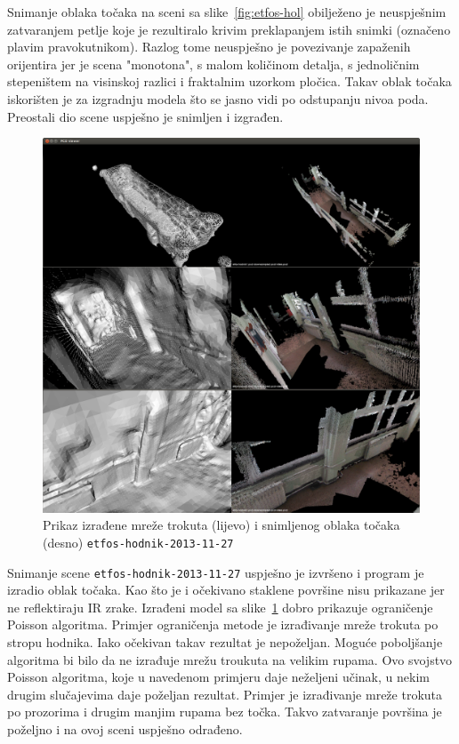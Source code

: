Snimanje oblaka točaka na sceni sa slike~\ref{fig:etfos-hol} obilježeno
je neuspješnim zatvaranjem petlje koje je rezultiralo krivim
preklapanjem istih snimki (označeno plavim pravokutnikom). Razlog tome
neuspješno je povezivanje zapaženih orijentira jer je scena "monotona",
s malom količinom detalja, s jednoličnim stepeništem na visinskoj
razlici i fraktalnim uzorkom pločica. Takav oblak točaka iskorišten je
za izgradnju modela što se jasno vidi po odstupanju nivoa poda.
Preostali dio scene uspješno je snimljen i izgrađen.

\newpage
\begin{figure}[h]
\centering
\includegraphics[scale=0.25]{figures/04-etfos-hodnik1-vtk-pcd-all.png}
\caption{Prikaz izrađene mreže trokuta (lijevo) i snimljenog oblaka točaka
(desno) \texttt{etfos-hodnik-2013-11-27}} 
\label{fig:etfos-hodnik}
\end{figure}

Snimanje scene \texttt{etfos-hodnik-2013-11-27} uspješno je izvršeno i
program je izradio oblak točaka. Kao što je i očekivano staklene
površine nisu prikazane jer ne reflektiraju IR zrake. Izrađeni model sa
slike~\ref{fig:etfos-hodnik} dobro prikazuje ograničenje Poisson
algoritma. Primjer ograničenja metode je izrađivanje mreže trokuta po
stropu hodnika. Iako očekivan takav rezultat je nepoželjan. Moguće
poboljšanje algoritma bi bilo da ne izrađuje mrežu troukuta na velikim
rupama. Ovo svojstvo Poisson algoritma, koje u navedenom primjeru daje
neželjeni učinak, u nekim drugim slučajevima daje poželjan rezultat.
Primjer je izrađivanje mreže trokuta po prozorima i drugim manjim rupama
bez točka. Takvo zatvaranje površina je poželjno i na ovoj sceni
uspješno odrađeno.



